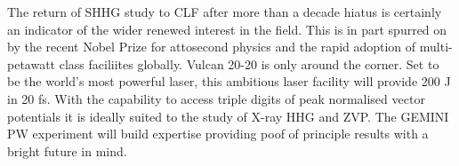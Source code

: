 The return of SHHG study to CLF after more than a decade hiatus is certainly an indicator of the wider renewed interest in the field. This is in part spurred on by the recent Nobel Prize for attosecond physics and the rapid adoption of multi-petawatt class faciliites globally. Vulcan 20-20 is only around the corner. Set to be the world's most powerful laser, this ambitious laser facility will provide 200 J in 20 fs. With the capability to access triple digits of peak normalised vector potentials it is ideally suited to the study of X-ray HHG and ZVP. The GEMINI PW experiment will build expertise providing poof of principle results with a bright future in mind.
